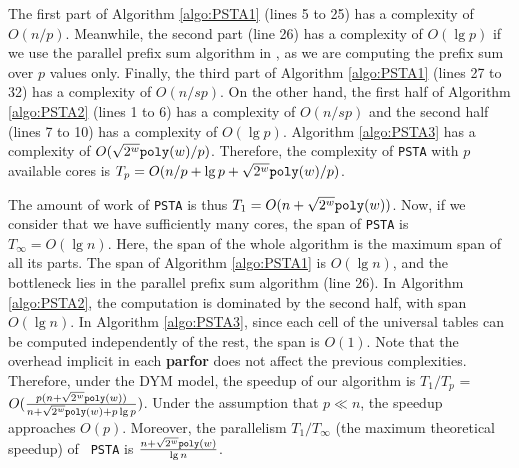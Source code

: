 The first part of Algorithm \ref{algo:PSTA1} (lines 5 to 25) has a
complexity of $O(n/p)$. Meanwhile, the second part (line 26)
has a complexity of $O(\lg p)$ if we use the parallel prefix sum
algorithm in \cite{Reif1993}, as we are computing the prefix sum over $p$ values only. Finally, the third part of Algorithm
\ref{algo:PSTA1} (lines 27 to 32) has a complexity of
$O(n/sp)$. On the other hand, the first half of Algorithm
\ref{algo:PSTA2} (lines 1 to 6) has a complexity of
$O(n/sp)$ and the second half (lines 7 to 10) has a
complexity of $O(\lg p)$. Algorithm \ref{algo:PSTA3} has a
complexity of $O(\sqrt{2^{w}}\mathtt{poly}(w)/p)$. Therefore, the
complexity of {\tt PSTA} with $p$ available cores is $T_p =
O(n/p+\lg p+\sqrt{2^{w}}\mathtt{poly}(w)/p)$.

The amount of work of {\tt PSTA} is thus $T_{1}=O(n+\sqrt{2^{w}}\mathtt{poly}(w))$.
Now, if we consider that we have sufficiently many cores, the span of {\tt PSTA} is $T_{\infty}=O(\lg n)$. Here, the
span of the whole algorithm is the maximum span of all its parts. The
span of Algorithm \ref{algo:PSTA1} is $O(\lg n)$, and the bottleneck lies in the parallel prefix sum algorithm (line
26). In Algorithm \ref{algo:PSTA2}, the computation is dominated by
the second half, with span $O(\lg n)$. In Algorithm
\ref{algo:PSTA3}, since each cell of the universal tables can be
computed independently of the rest, the span is $O(1)$. Note that the
overhead implicit in each {\bf parfor} does not affect the previous
complexities. Therefore, under the DYM model, the speedup of our algorithm is $T_1/T_p$ =
$O(\frac{p(n+\sqrt{2^{w}}\mathtt{poly}(w))}{n+\sqrt{2^{w}}\mathtt{poly}(w)+p\lg
p})$. Under the assumption that $p\ll n$, the speedup approaches
$O(p)$. Moreover, the
parallelism $T_1/T_{\infty}$ (the maximum theoretical speedup) of {\tt
PSTA} is $\frac{n+\sqrt{2^{w}}\mathtt{poly}(w)}{\lg n}$.

